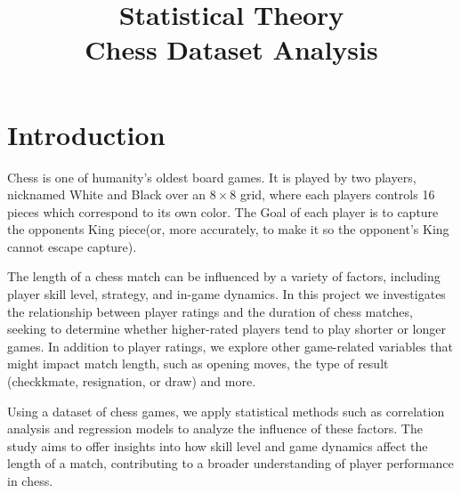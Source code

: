 \documentclass[conference]{IEEEtran}
\title{
Statistical Theory\\
Chess Dataset Analysis
}
\author{
   \IEEEauthorblockN{Dor Boker, Itamar Nakar}
   \IEEEauthorblockA{
      I.D: , 325829000\\
      Email: , itamar.nakar@gmail.com
   }
}
\begin{document}
\maketitle

\section{Introduction}
Chess is one of humanity's oldest board games. It is played by two players, nicknamed White and Black over an $8\times8$ grid, where each players controls 16 pieces which correspond to its own color. The Goal of each player is to capture the opponents King piece(or, more accurately, to make it so the opponent's King cannot escape capture).

The length of a chess match can be influenced by a variety of factors, including player skill level, strategy, and in-game dynamics. In this project we investigates the relationship between player ratings and the duration of chess matches, seeking to determine whether higher-rated players tend to play shorter or longer games. In addition to player ratings, we explore other game-related variables that might impact match length, such as opening moves, the type of result (checkkmate, resignation, or draw) and more.

Using a dataset of chess games, we apply statistical methods such as correlation analysis and regression models to analyze the influence of these factors. The study aims to offer insights into how skill level and game dynamics affect the length of a match, contributing to a broader understanding of player performance in chess.
\end{document}
